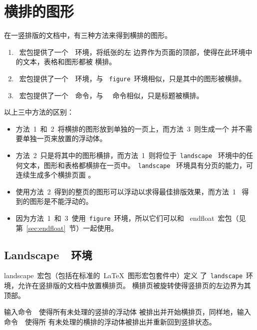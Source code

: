 \section{横排的图形}

\noindent 在一竖排版的文档中，有三种方法来得到横排的图形。
\begin{enumerate}
	\item {}~宏包提供了一个~~环境，将纸张的左
	边界作为页面的顶部，使得在此环境中的文本，表格和图形都被
	横排。
	\item {}~宏包提供了一个~~环境，与
	~\texttt{figure}~环境相似，只是其中的图形被横排。
	\item {}~宏包提供了一个~~命令，与
	~~命令相似，只是标题被横排。
\end{enumerate}

\noindent 以上三中方法的区别：
\begin{itemize}
	\item 方法~1~和~2~将横排的图形放到单独的一页上，而方法~3~则生成一个
	并不需要单独一页来放置的浮动体。
	\item 方法~2~只是将其中的图形横排，而方法~1~则将位于~\texttt{landscape}~
	环境中的任何文本，图形和表格都横排在一页中。~\texttt{landscape}~
	环境具有分页的能力，可连续生成多个横排页面
	。
	\item 使用方法~2~得到的整页的图形可以浮动以求得最佳排版效果，而方法~1~
	得到的图形是不能浮动的。
	\item 因为方法~1~和~3~使用~\texttt{figure}~环境，所以它们可以和
	~\textsf{endfloat}~宏包（见第~\ref{sec:endfloat}~节）一起使用。
\end{itemize}

\subsection{Landscape~~环境}\label{ssec:landscape}

\textsf{landscape}~宏包（包括在标准的~\LaTeX{}~图形宏包套件中）定义
了~\texttt{landscape}~环境，允许在竖排版的文档中放置横排页。
横排页被旋转使得竖排页的左边界为其顶部。

输入命令~~使得所有未处理的竖排的浮动体
被排出并开始横排页，同样地，输入命令~~使得所
有未处理的横排的浮动体被排出并重新回到竖排状态。

